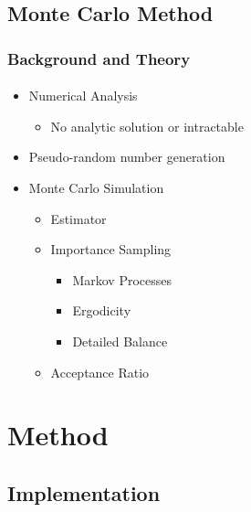 \documentclass{beamer}
\begin{document}
  \subsection{Monte Carlo Method}
  \begin{frame}
    \frametitle{Background and Theory}
    \framesubtitle{}
    \begin{itemize}
    	\item Numerical Analysis
    	\begin{itemize}
    		\item No analytic solution or intractable
    	\end{itemize}
    	\item Pseudo-random number generation
    	\item Monte Carlo Simulation
    	\begin{itemize}
    		\item Estimator
    		\item Importance Sampling
    		\begin{itemize}
    			\item Markov Processes
    			\item Ergodicity
    			\item Detailed Balance
    		\end{itemize}
    		\item Acceptance Ratio
    	\end{itemize}
    \end{itemize}
  \end{frame}

	\section{Method}
	\subsection{Implementation}
\end{document}
